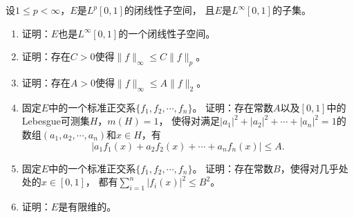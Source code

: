 \begin{26}[Grothendieck]
    设$1\leqslant p<\infty$，$E$是$L^p[0,1]$的闭线性子空间，
    且$E$是$L^\infty[0,1]$的子集。
    \begin{enumerate}[label=(\roman*)]
    \item 证明：$E$也是$L^\infty[0,1]$的一个闭线性子空间。
    \item 证明：存在$C>0$使得$\|f\|_\infty\leqslant C\|f\|_p$。
    \item 证明：存在$A>0$使得$\|f\|_\infty\leqslant A\|f\|_2$。
    \item 固定$E$中的一个标准正交系$\{f_1,f_2,\cdots,f_n\}$。
    证明：存在常数$A$以及$[0,1]$中的Lebesgue可测集$H$，$m(H)=1$，
    使得对满足$|a_1|^2+|a_2|^2+\cdots+|a_n|^2=1$的数组$(a_1,a_2,\cdots,a_n)$和$x\in H$，有
    $$|a_1f_1(x)+a_2f_2(x)+\cdots+a_nf_n(x)|\leqslant A.$$
    \item 固定$E$中的一个标准正交系$\{f_1,f_2,\cdots,f_n\}$。
    证明：存在常数$B$，使得对几乎处处的$x\in[0,1]$，
    都有$\displaystyle\sum_{i=1}^n|f_i(x)|^2\leqslant B^2$。
    \item 证明：$E$是有限维的。
    \end{enumerate}
\end{26}
